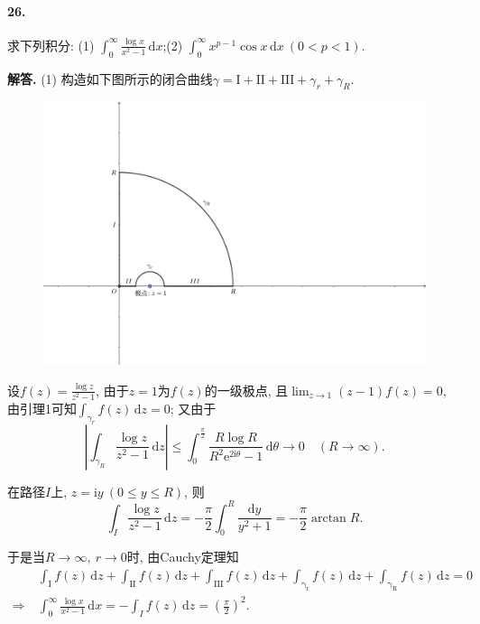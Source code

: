 \documentclass[12pt, a4paper, oneside]{ctexart}
\newenvironment{solution}{\par\noindent\textbf{解答. }}{\bigskip\par}
\let\leq=\leqslant %
\def\d{\mathrm{d}}      %
\def\e{\mathrm{e}}      %
\def\i{\mathrm{i}}      %
\def\add{\vspace{1ex}}  %
\begin{document}
\paragraph{26.}求下列积分:
(1) $\int_0^{\infty}\frac{\log x}{x^2-1}\,\d x$;\qquad (2) $\int_0^{\infty}x^{p-1}\cos x\,\d x\ (0 < p < 1)$.\add
\begin{solution}
    (1) 构造如下图所示的闭合曲线$\gamma = \mathrm{I}+\mathrm{II}+\mathrm{III}+\gamma_r+\gamma_R$.
    \begin{figure}[htbp]
        \centering
        \includegraphics[scale=0.5]{留数计算logx_(x^2-1) 0到inf上的积分.pdf}
    \end{figure}
    设$f(z) = \frac{\log z}{z^2-1}$, 由于$z=1$为$f(z)$的一级极点, 且$\lim_{z\to 1}(z-1)f(z) = 0$, 由引理1可知$\int_{\gamma_r}f(z)\,\d z = 0$; 又由于
    \begin{equation*}
        \left|\int_{\gamma_R}\frac{\log z}{z^2-1}\,\d z\right|\leq \int_0^{\frac{\pi}{2}}\frac{R\log R}{R^2\e^{2\i\theta}-1}\,\d \theta\to 0\quad(R\to\infty).
    \end{equation*}

    在路径$I$上, $z=\i y\ (0\leq y\leq R)$, 则
    \begin{equation*}
        \int_I\frac{\log z}{z^2-1}\,\d z = - \frac{\pi}{2}\int_0^R\frac{\d y}{y^2+1} = -\frac{\pi}{2}\arctan R.
    \end{equation*}

    于是当$R\to\infty,\ r\to 0$时, 由Cauchy定理知
    \begin{align*}
        &\ \int_{\mathrm{I}}f(z)\,\d z+\int_{\mathrm{II}}f(z)\,\d z+\int_{\mathrm{III}}f(z)\,\d z+\int_{\mathrm{\gamma_r}}f(z)\,\d z+\int_{\mathrm{\gamma_R}}f(z)\,\d z = 0\\
        \Rightarrow&\ \int_{0}^\infty\frac{\log x}{x^2-1}\,\d x = -\int_{I}f(z)\,\d z = \left(\frac{\pi}{2}\right)^2.
    \end{align*}


\end{solution}
\end{document}
